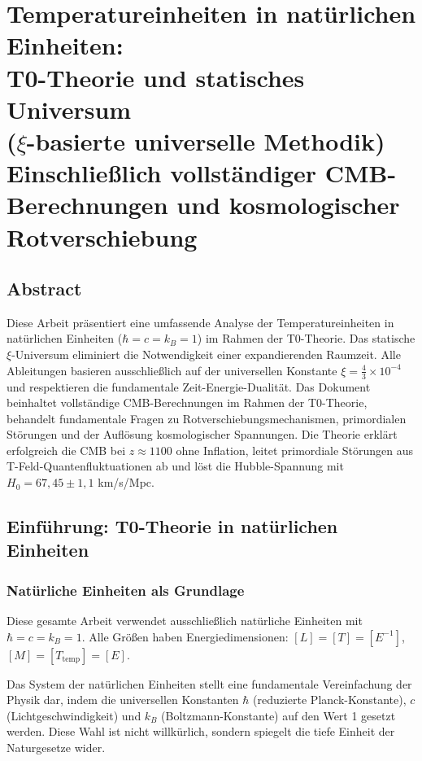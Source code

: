 \chapter{Temperatureinheiten in natürlichen Einheiten: \\
		T0-Theorie und statisches Universum \\
		($\xi$-basierte universelle Methodik)\\
		 Einschließ{}lich vollständiger CMB-Berechnungen und kosmologischer Rotverschiebung}


	
\section*{Abstract}
		Diese Arbeit präsentiert eine umfassende Analyse der Temperatureinheiten in natürlichen Einheiten ($\hbar = c = k_B = 1$) im Rahmen der T0-Theorie. Das statische $\xi$-Universum eliminiert die Notwendigkeit einer expandierenden Raumzeit. Alle Ableitungen basieren ausschließ{}lich auf der universellen Konstante $\xi = \frac{4}{3} \times 10^{-4}$ und respektieren die fundamentale Zeit-Energie-Dualität. Das Dokument beinhaltet vollständige CMB-Berechnungen im Rahmen der T0-Theorie, behandelt fundamentale Fragen zu Rotverschiebungsmechanismen, primordialen Störungen und der Auflösung kosmologischer Spannungen. Die Theorie erklärt erfolgreich die CMB bei $z \approx 1100$ ohne Inflation, leitet primordiale Störungen aus T-Feld-Quantenfluktuationen ab und löst die Hubble-Spannung mit $H_0 = 67,45 \pm 1,1$ km/s/Mpc.

	
	
	\section{Einführung: T0-Theorie in natürlichen Einheiten}
	
	\subsection{Natürliche Einheiten als Grundlage}
	
	\begin{important}
		Diese gesamte Arbeit verwendet ausschließ{}lich natürliche Einheiten mit $\hbar = c = k_B = 1$. Alle Größ{}en haben Energiedimensionen: $[L] = [T] = [E^{-1}]$, $[M] = [T_{\text{temp}}] = [E]$.
	\end{important}
	
	Das System der natürlichen Einheiten stellt eine fundamentale Vereinfachung der Physik dar, indem die universellen Konstanten $\hbar$ (reduzierte Planck-Konstante), $c$ (Lichtgeschwindigkeit) und $k_B$ (Boltzmann-Konstante) auf den Wert 1 gesetzt werden. Diese Wahl ist nicht willkürlich, sondern spiegelt die tiefe Einheit der Naturgesetze wider.
	

